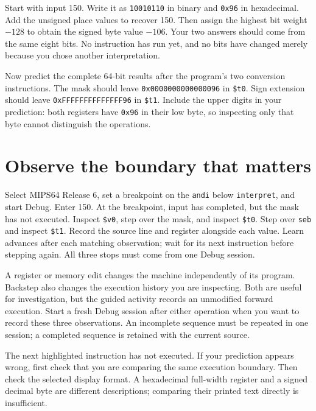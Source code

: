 \begingroup
{}
Start with input 150. Write it as \texttt{10010110} in binary and \texttt{0x96}
in hexadecimal. Add the unsigned place values to recover 150. Then assign the
highest bit weight $-128$ to obtain the signed byte value $-106$. Your two answers
should come from the same eight bits. No instruction has run yet, and no bits
have changed merely because you chose another interpretation.
\par
\endgroup

Now predict the complete 64-bit results after the program's two conversion
instructions. The mask should leave \texttt{0x0000000000000096} in
\texttt{\$t0}. Sign extension should leave \texttt{0xFFFFFFFFFFFFFF96} in
\texttt{\$t1}. Include the upper digits in your prediction: both registers have
\texttt{0x96} in their low byte, so inspecting only that byte cannot distinguish
the operations.

\section{Observe the boundary that matters}

Select MIPS64 Release 6, set a breakpoint on the \texttt{andi} below
\texttt{interpret}, and start Debug. Enter 150. At the breakpoint, input has
completed, but the mask has not executed. Inspect \texttt{\$v0}, step over the
mask, and inspect \texttt{\$t0}. Step over \texttt{seb} and inspect
\texttt{\$t1}. Record the source line and register alongside each value.
Learn advances after each matching observation; wait for its next instruction
before stepping again. All three stops must come from one Debug session.

A register or memory edit changes the machine independently of its program.
Backstep also changes the execution history you are inspecting. Both are useful
for investigation, but the guided activity records an unmodified forward
execution. Start a fresh Debug session after either operation when you want to
record these three observations. An incomplete sequence must be repeated in
one session; a completed sequence is retained with the current source.

The next highlighted instruction has not executed. If your prediction appears
wrong, first check that you are comparing the same execution boundary. Then
check the selected display format. A hexadecimal full-width register and a signed
decimal byte are different descriptions; comparing their printed text directly
is insufficient.

